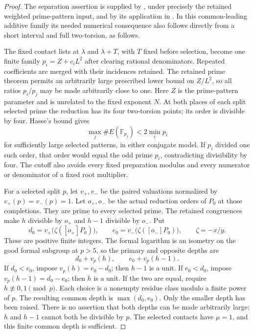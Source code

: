 \documentclass[11pt,a4paper]{article}
\begin{document}
\begin{proof}
The separation assertion is supplied by
\cite[Theorem 2.2]{PrimeSeparation}, under precisely the retained
weighted prime-pattern input, and by its application in
\cite[P16]{Uniform}. In this common-leading additive family its
needed numerical consequence also follows directly from a short
interval and full two-torsion, as follows.

The fixed contact lists at $\lambda$ and $\lambda+T$, with $T$
fixed before selection, become one finite family
$p_i=Z+c_iL^2$ after clearing rational denominators. Repeated
coefficients are merged with their incidences retained. The retained
prime theorem permits an arbitrarily large prescribed lower bound
on $Z/L^2$, so all ratios $p_i/p_j$ may be made arbitrarily close
to one. Here $Z$ is the prime-pattern parameter and is unrelated to
the fixed exponent $N$. At both places of each split selected prime the reduction
has its four two-torsion points; its order is divisible by four.
Hasse's bound gives
\[
                 \max_j\#E(\mathbb F_{p_j})<2\min_i p_i
\]
for sufficiently large selected patterns, in either conjugate model.
If $p_i$ divided one such order, that order would equal the odd
prime $p_i$, contradicting divisibility by four. The cutoff also
avoids every fixed preparation modulus and every numerator or
denominator of a fixed root multiplier.

For a selected split $p$, let $v_+,v_-$ be the paired valuations
normalized by $v_+(p)=v_-(p)=1$. Let $o_+,o_-$ be the actual
reduction orders of $P_0$ at those completions. They are prime to
every selected prime.
The retained congruences make $h$ divisible by $o_+$ and $h-1$
divisible by $o_-$. Put
\[
 d_0=v_+\bigl(\zeta([o_+]P_0)\bigr),\qquad
 e_0=v_-\bigl(\zeta([o_-]P_0)\bigr),\qquad \zeta=-x/y.
\]
These are positive finite integers. The formal logarithm is an
isometry on the good formal subgroup at $p>5$, so the primary and
opposite depths are
\[
                    d_0+v_p(h),\qquad e_0+v_p(h-1).
\]
If $d_0<e_0$, impose $v_p(h)=e_0-d_0$; then $h-1$ is a unit.
If $e_0<d_0$, impose $v_p(h-1)=d_0-e_0$; then $h$ is a unit.
If the two are equal, require $h\not\equiv0,1\pmod p$.
Each choice is a nonempty residue class modulo a finite power of $p$.
The resulting common depth is $\max(d_0,e_0)$.
Only the smaller depth has been raised. There is no assertion that
both depths can be made arbitrarily large: $h$ and $h-1$ cannot both
be divisible by $p$. The selected contacts have $\mu=1$, and this
finite common depth is sufficient.


\end{proof}
\end{document}
